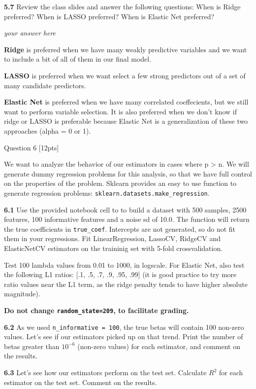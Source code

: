 \documentclass[11pt]{article}
\begin{document}
    \textbf{5.7} Review the class slides and answer the following questions:
When is Ridge preferred? When is LASSO preferred? When is Elastic Net
preferred?

    \emph{your answer here}

\textbf{Ridge} is preferred when we have many weakly predictive
variables and we want to include a bit of all of them in our final
model.

\textbf{LASSO} is preferred when we want select a few strong predictors
out of a set of many candidate predictors.

\textbf{Elastic Net} is preferred when we have many correlated
coeffecients, but we still want to perform variable selection. It is
also preferred when we don't know if ridge or LASSO is preferable
because Elastic Net is a generalization of these two approaches (alpha =
0 or 1). 

     Question 6 {[}12pts{]}

We want to analyze the behavior of our estimators in cases where p
\textgreater{} n. We will generate dummy regression problems for this
analysis, so that we have full control on the properties of the problem.
Sklearn provides an easy to use function to generate regression
problems: \texttt{sklearn.datasets.make\_regression}.

    \textbf{6.1} Use the provided notebook cell to to build a dataset with
500 samples, 2500 features, 100 informative features and a noise sd of
10.0. The function will return the true coefficients in
\texttt{true\_coef}. Intercepts are not generated, so do not fit them in
your regressions. Fit LinearRegression, LassoCV, RidgeCV and
ElasticNetCV estimators on the traininig set with 5-fold
crossvalidation.

Test 100 lambda values from 0.01 to 1000, in logscale. For Elastic Net,
also test the following L1 ratios: {[}.1, .5, .7, .9, .95, .99{]} (it is
good practice to try more ratio values near the L1 term, as the ridge
penalty tends to have higher absolute magnitude).

\textbf{Do not change \texttt{random\_state=209}, to facilitate
grading.}

\textbf{6.2} As we used \texttt{n\_informative\ =\ 100}, the true betas
will contain 100 non-zero values. Let's see if our estimators picked up
on that trend. Print the number of betas greater than \(10^{-6}\)
(non-zero values) for each estimator, and comment on the results.

\textbf{6.3} Let's see how our estimators perform on the test set.
Calculate \(R^2\) for each estimator on the test set. Comment on the
results.
\end{document}
